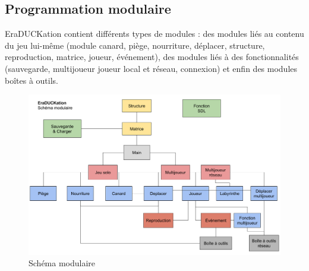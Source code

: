 \documentclass[12pt,a4paper,twoside]{article}
\begin{document}
\subsection{Programmation modulaire}
EraDUCKation contient différents types de modules : des modules liés au contenu du jeu lui-même (module canard, piège, nourriture, déplacer, structure, reproduction, matrice, joueur, événement), des modules liés à des fonctionnalités (sauvegarde, multijoueur joueur local et réseau, connexion) et enfin des modules boîtes à outils.
\begin{figure}[h]
\centering
\includegraphics[width=1\textwidth]{module.png}
\caption{Schéma modulaire}
\end{figure}
\end{document}
